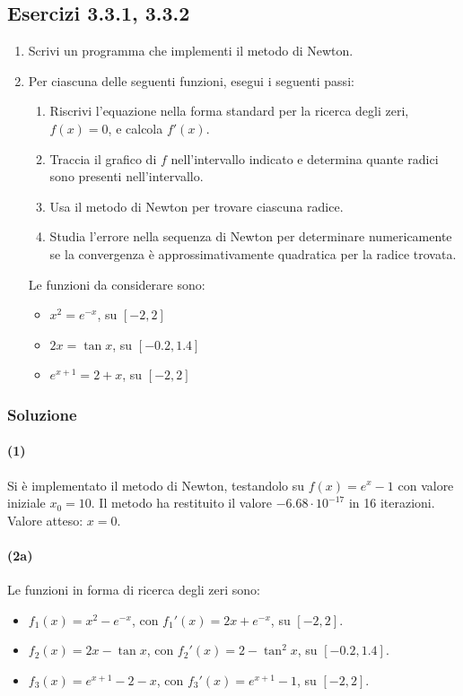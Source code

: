 \documentclass[letterpaper, 12pt]{article}
\numberwithin{equation}{section}    %
\begin{document}
\subsection{Esercizi 3.3.1, 3.3.2}
\label{sec:332}
\begin{enumerate}
    \item Scrivi un programma che implementi il metodo di Newton.
    \item Per ciascuna delle seguenti funzioni, esegui i seguenti passi:
    \begin{enumerate}
        \item Riscrivi l'equazione nella forma standard per la ricerca degli zeri, $f(x) = 0$, e calcola $f'(x)$.
        \item Traccia il grafico di $f$ nell'intervallo indicato e determina quante radici sono presenti 
        nell'intervallo.
        \item Usa il metodo di Newton per trovare ciascuna radice.
        \item Studia l'errore nella sequenza di Newton per determinare numericamente se la convergenza è 
        approssimativamente quadratica per la radice trovata.
    \end{enumerate}
Le funzioni da considerare sono:
    \begin{itemize}
        \item $x^2 = e^{-x}$, su $[-2,2]$
        \item $2x = \tan x$, su $[-0.2,1.4]$
        \item $e^{x+1} = 2 + x$, su $[-2,2]$
    \end{itemize}
\end{enumerate}
    
\subsubsection{Soluzione}
\paragraph{(1)}Si è implementato il metodo di Newton, testandolo su $f(x)=e^x - 1$ con valore
iniziale $x_0 = 10$. Il metodo ha restituito il valore $-6.68 \cdot 10^{-17}$ in 16 iterazioni. 
Valore atteso: $x = 0$. 

\paragraph{(2a)}\label{sec:332_2a}Le funzioni in forma di ricerca degli zeri sono:
\begin{itemize}
    \item $f_1(x) = x^2 - e^{-x}$, con $f_1'(x) = 2x + e^{-x}$, su $[-2,2]$.
    \item $f_2(x) = 2x - \tan x$, con $f_2'(x) = 2 - \tan^2 x$, su $[-0.2,1.4]$.
    \item $f_3(x) = e^{x+1} - 2 - x$, con $f_3'(x) = e^{x+1} - 1$, su $[-2,2]$.
\end{itemize}
\end{document}
